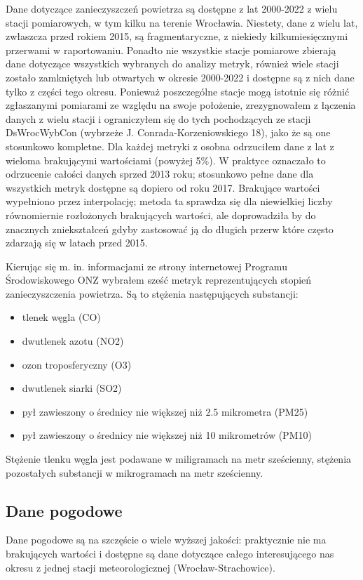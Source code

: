 \documentclass[18pt, letterpaper]{article}
\begin{document}
Dane dotyczące zanieczyszczeń powietrza są dostępne z lat 2000-2022 z wielu stacji pomiarowych, w tym kilku na terenie Wrocławia. Niestety, dane z wielu lat, zwłaszcza przed rokiem 2015, są fragmentaryczne, z niekiedy kilkumiesięcznymi przerwami w raportowaniu. Ponadto nie wszystkie stacje pomiarowe zbierają dane dotyczące wszystkich wybranych do analizy metryk, również wiele stacji zostało zamkniętych lub otwartych w okresie 2000-2022 i dostępne są z nich dane tylko z części tego okresu. Ponieważ poszczególne stacje mogą istotnie się różnić zgłaszanymi pomiarami ze względu na swoje położenie, zrezygnowałem z łączenia danych z wielu stacji i ograniczyłem się do tych pochodzących ze stacji DsWrocWybCon (wybrzeże J. Conrada-Korzeniowskiego 18), jako że są one stosunkowo kompletne. Dla każdej metryki z osobna odrzuciłem dane z lat z wieloma brakującymi wartościami (powyżej 5\%). W praktyce oznaczało to odrzucenie całości danych sprzed 2013 roku; stosunkowo pełne dane dla wszystkich metryk dostępne są dopiero od roku 2017. Brakujące wartości wypełniono przez interpolację; metoda ta sprawdza się dla niewielkiej liczby równomiernie rozłożonych brakujących wartości, ale doprowadziła by do znacznych zniekształceń gdyby zastosować ją do długich przerw które często zdarzają się w latach przed 2015.

Kierując się m. in. informacjami ze strony internetowej Programu Środowiskowego ONZ \cite{un_air_pollution} wybrałem sześć metryk reprezentujących stopień zanieczyszczenia powietrza. Są to stężenia następujących substancji: 
\begin{itemize}
\item tlenek węgla (CO)
\item dwutlenek azotu (NO2)
\item ozon troposferyczny (O3)
\item dwutlenek siarki (SO2)
\item pył zawieszony o średnicy nie większej niż 2.5 mikrometra (PM25)
\item pył zawieszony o średnicy nie większej niż 10 mikrometrów (PM10)
\end{itemize}
Stężenie tlenku węgla jest podawane w miligramach na metr sześcienny, stężenia pozostałych substancji w mikrogramach na metr sześcienny.

\subsection{Dane pogodowe}
Dane pogodowe są na szczęście o wiele wyższej jakości: praktycznie nie ma brakujących wartości i dostępne są dane dotyczące całego interesującego nas okresu z jednej stacji meteorologicznej (Wrocław-Strachowice). 
\end{document}
